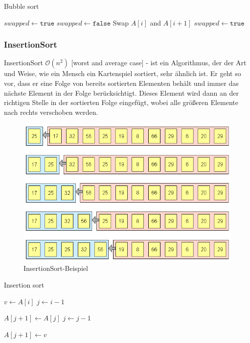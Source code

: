 \documentclass[a4paper]{article}
\begin{document}
\begin{algorithm}
    \caption{Bubble sort}
    \label{alg:BubbleSort}
    \begin{algorithmic} 
        \State $swapped \gets \texttt{true}$
        \State $swapped \gets \texttt{false}$
        \State Swap $A\left[i\right]$ and $A\left[i+1\right]$
        \State $swapped \gets \texttt{true}$
        \EndIf
        \EndFor
        \EndWhile
    \end{algorithmic}
\end{algorithm}

\newpage
 \subsubsection{InsertionSort}\label{Insertionsort}
    InsertionSort $\mathcal{O}(n^2)$ [worst and average case] - ist ein Algorithmus, der der Art und Weise, wie ein Mensch ein Kartenspiel sortiert, sehr ähnlich ist. Er geht so vor, dass er eine Folge von bereits sortierten Elementen behält und immer das nächste Element in der Folge berücksichtigt. Dieses Element wird dann an der richtigen Stelle in der sortierten Folge eingefügt, wobei alle größeren Elemente nach rechts verschoben werden.
    \begin{figure}[h]
        \centering
        \includegraphics[scale=0.3]{Pictures/insertionsort_version1.png}
        \caption{InsertionSort-Beispiel}
        \label{fig:InsertionSort}
    \end{figure}

\begin{algorithm}
    \caption{Insertion sort}
    \label{alg:InsertionSort}
    \begin{algorithmic} 
        \State $v \gets A\left[i\right]$
        \State $j \gets i-1$
        
        \State $A\left[j+1\right] \gets A\left[j\right]$
        \State $j\leftarrow j-1$
        \EndWhile
        
        \State $A\left[j+1\right] \gets v$
        \EndFor
    \end{algorithmic}
\end{algorithm}
\end{document}
